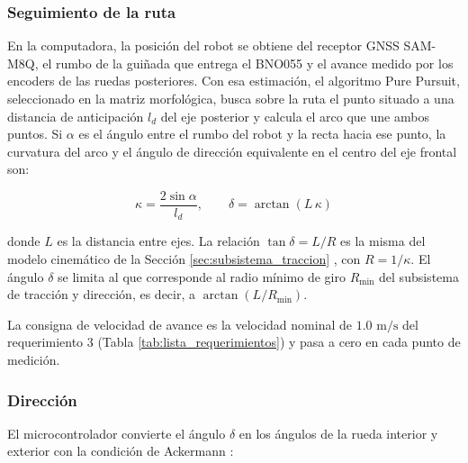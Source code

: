 \documentclass[../../General.tex]{subfiles}
\begin{document}
\subsubsection{Seguimiento de la ruta}

En la computadora, la posición del robot se obtiene del receptor GNSS SAM-M8Q, el rumbo de la guiñada que entrega el BNO055 y el avance medido por los encoders de las ruedas posteriores. Con esa estimación, el algoritmo Pure Pursuit, seleccionado en la matriz morfológica, busca sobre la ruta el punto situado a una distancia de anticipación $l_d$ del eje posterior y calcula el arco que une ambos puntos. Si $\alpha$ es el ángulo entre el rumbo del robot y la recta hacia ese punto, la curvatura del arco y el ángulo de dirección equivalente en el centro del eje frontal son:

\begin{equation}\label{eq:pure_pursuit}
    \kappa = \frac{2\sin\alpha}{l_d}, \qquad \delta = \arctan\left(L\,\kappa\right)
\end{equation}

donde $L$ es la distancia entre ejes. La relación $\tan\delta = L/R$ es la misma del modelo cinemático de la Sección \ref{sec:subsistema_traccion} \citep{siegwart2004mobile, jazar2017vehicle}, con $R = 1/\kappa$. El ángulo $\delta$ se limita al que corresponde al radio mínimo de giro $R_{\min}$ del subsistema de tracción y dirección, es decir, a $\arctan\left(L/R_{\min}\right)$.

La consigna de velocidad de avance es la velocidad nominal de $1.0\text{ m/s}$ del requerimiento 3 (Tabla \ref{tab:lista_requerimientos}) y pasa a cero en cada punto de medición.

\subsubsection{Dirección}

El microcontrolador convierte el ángulo $\delta$ en los ángulos de la rueda interior y exterior con la condición de Ackermann \citep{siegwart2004mobile, jazar2017vehicle}:
\end{document}
